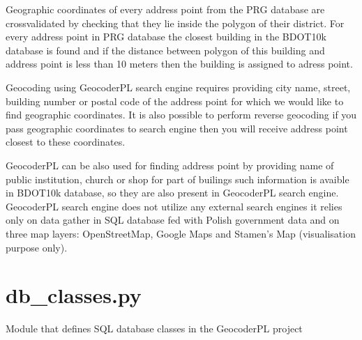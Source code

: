 \documentclass[letterpaper,10pt,english]{sphinxmanual}
\begin{document}
\sphinxAtStartPar
Geographic coordinates of every address point from the PRG database are cross\sphinxhyphen{}validated by checking that they lie inside the polygon of their district. For every address point in PRG database the closest building in the BDOT10k database is found and if the distance between polygon of this building and address point is less than 10 meters then the building is assigned to adress point.

\sphinxAtStartPar
Geocoding using GeocoderPL search engine requires providing city name, street, building number or postal code of the address point for which we would like to find geographic coordinates. It is also possible to perform reverse geocoding \sphinxhyphen{} if you pass geographic coordinates to search engine then you will receive address point closest to these coordinates.

\sphinxAtStartPar
GeocoderPL can be also used for finding address point by providing name of public institution, church or shop \sphinxhyphen{} for part of builings such information is avaible in BDOT10k database, so they are also present in GeocoderPL search engine. GeocoderPL search engine does not utilize any external search engines \sphinxhyphen{} it relies only on data gather in SQL database fed with Polish government data and on three map layers: OpenStreetMap, Google Maps and Stamen’s Map (visualisation purpose only).

\sphinxstepscope


\chapter{db\_classes.py}
\label{\detokenize{db_classes:module-db_classes}}\label{\detokenize{db_classes:db-classes-py}}\label{\detokenize{db_classes::doc}}
\sphinxAtStartPar
Module that defines SQL database classes in the GeocoderPL project
\end{document}

